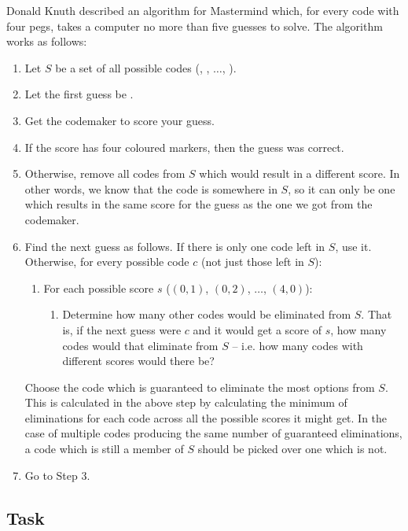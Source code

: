 Donald Knuth described an algorithm for Mastermind which, for every code with four pegs, takes a computer no more than five guesses to solve. The algorithm works as follows:

\begin{enumerate}
    \item Let $S$ be a set of all possible codes (, , $\ldots$, ).
    \item Let the first guess be .
    \item Get the codemaker to score your guess.
    \item If the score has four coloured markers, then the guess was correct.
    \item Otherwise, remove all codes from $S$ which would result in a different score. In other words, we know that the code is somewhere in $S$, so it can only be one which results in the same score for the guess as the one we got from the codemaker. 
    \item Find the next guess as follows. If there is only one code left in $S$, use it. Otherwise, for every possible code $c$ (not just those left in $S$):
    \begin{enumerate}
        \item For each possible score $s$ ($(0,1)$, $(0,2)$, $\ldots$, $(4,0)$):
        \begin{enumerate}
            \item Determine how many other codes would be eliminated from $S$. That is, if the next guess were $c$ and it would get a score of $s$, how many codes would that eliminate from $S$ -- i.e. how many codes with different scores would there be?
        \end{enumerate}
    \end{enumerate}
    Choose the code which is guaranteed to eliminate the most options from $S$. This is calculated in the above step by calculating the minimum of eliminations for each code across all the possible scores it might get.
    In the case of multiple codes producing the same number of guaranteed eliminations, a code which is still a member of $S$ should be picked over one which is not.
    \item Go to Step 3.
\end{enumerate}


\subsection{Task}

